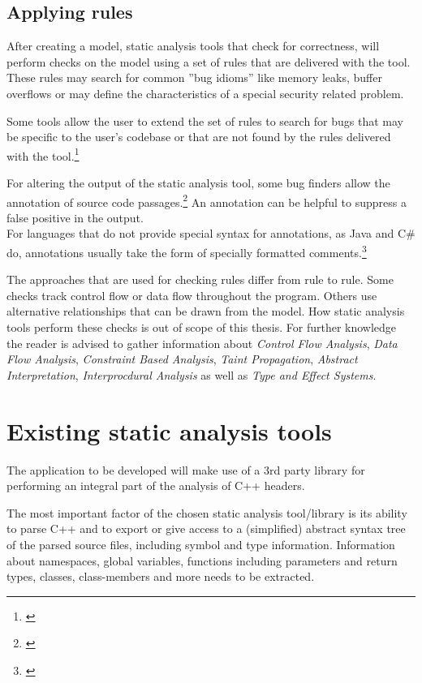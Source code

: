 \subsection{Applying rules}

After creating a model, static analysis tools that check for correctness, will perform checks on the model using a set of rules that are delivered with the tool. These rules may search for common ''bug idioms'' like memory leaks, buffer overflows or may define the characteristics of a special security related problem.

Some tools allow the user to extend the set of rules to search for bugs that may be specific to the user's codebase or that are not found by the rules delivered with the tool.\footnote{\citep[97]{SecureProgramming}}

For altering the output of the static analysis tool, some bug finders allow the annotation of source code passages.\footnote{\citep[99]{SecureProgramming}} An annotation can be helpful to suppress a false positive in the output.
\\For languages that do not provide special syntax for annotations, as Java and C\# do, annotations usually
take the form of specially formatted comments.\footnote{\citep[99]{SecureProgramming}}

The approaches that are used for checking rules differ from rule to rule. Some checks track control flow or data flow throughout the program. Others use alternative relationships that can be drawn from the model. How static analysis tools perform these checks is out of scope of this thesis. For further knowledge the reader is advised to gather information about \textit{Control Flow Analysis}, \textit{Data Flow Analysis}, \textit{Constraint Based Analysis}, \textit{Taint Propagation}, \textit{Abstract Interpretation}, \textit{Interprocdural Analysis }as well as \textit{Type and Effect Systems}. 

\section{Existing static analysis tools}

The application to be developed will make use of a 3rd party library for performing an integral part of the analysis of C++ headers. 

The most important factor of the chosen static analysis tool/library is its ability to parse C++ and to export or give access to a (simplified) abstract syntax tree of the parsed source files, including symbol and type information. Information about namespaces, global variables, functions including parameters and return types, classes, class-members and more needs to be extracted.

